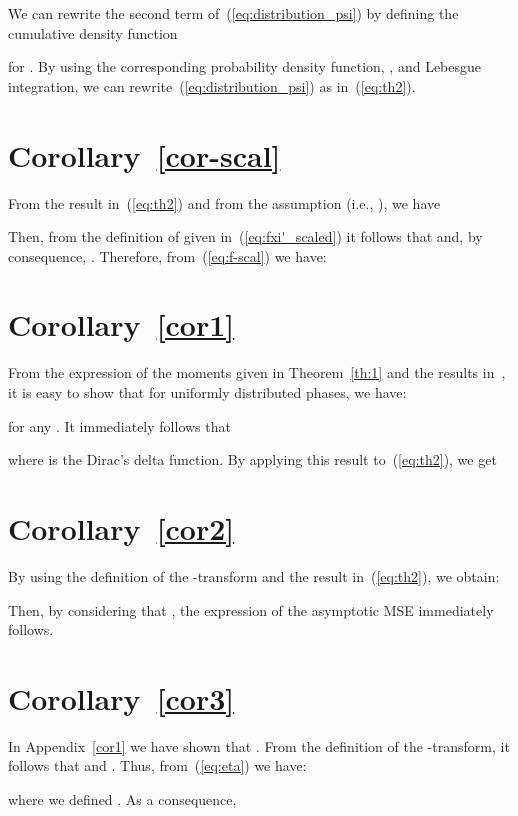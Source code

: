\documentclass[11pt, draftcls, onecolumn, a4paper]{IEEEtran}
\begin{document}
We can rewrite the second term of~(\ref{eq:distribution_psi}) by
defining the cumulative density function 
 
for . By using the corresponding probability
  density function, , and Lebesgue integration, we can
 rewrite~(\ref{eq:distribution_psi}) as in~(\ref{eq:th2}).


\section{Corollary~\ref{cor-scal}}
\label{app:cor-scal}
From the result in~(\ref{eq:th2}) and from the assumption
  (i.e., ), we have

Then, from the definition of  given
in~(\ref{eq:fxi'_scaled}) it follows that 
and, by consequence, . Therefore,
from~(\ref{eq:f-scal}) we have:


\section{Corollary~\ref{cor1}}
\label{app:cor1}
From the expression of the moments given in Theorem~\ref{th:1} and the
results in~\cite{TSP2}, it is easy to show that for uniformly
distributed phases, we have:

for any . It immediately follows that 

where  is the Dirac's delta function. By applying this
result to~(\ref{eq:th2}), we get


\section{Corollary~\ref{cor2}}
\label{app:cor2}
By using the definition of the -transform and the result
in~(\ref{eq:th2}), we  obtain:

Then, by considering that , 
the expression of the asymptotic MSE 
immediately follows. 

\section{Corollary~\ref{cor3}}
\label{app:cor3}
In Appendix~\ref{cor1} we have shown that . From the definition of
the -transform, it follows that  and
. Thus, from~(\ref{eq:eta}) we have:

where we defined .
As a consequence,
\end{document}

